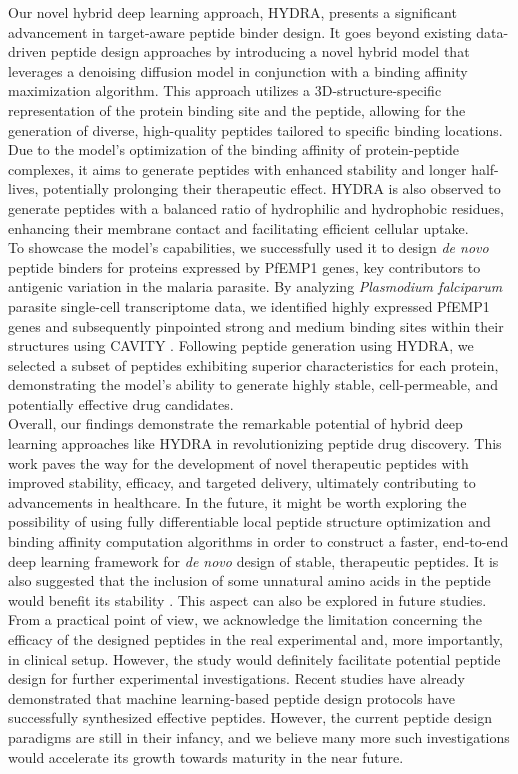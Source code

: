 Our novel hybrid deep learning approach, HYDRA, presents a significant advancement in target-aware peptide binder design. It goes beyond existing data-driven peptide design approaches by introducing a novel hybrid model that leverages a denoising diffusion model in conjunction with a binding affinity maximization algorithm. This approach utilizes a 3D-structure-specific representation of the protein binding site and the peptide, allowing for the generation of diverse, high-quality peptides tailored to specific binding locations. Due to the model's optimization of the binding affinity of protein-peptide complexes, it aims to generate peptides with enhanced stability and longer half-lives, potentially prolonging their therapeutic effect. HYDRA is also observed to generate peptides with a balanced ratio of hydrophilic and hydrophobic residues, enhancing their membrane contact and facilitating efficient cellular uptake.  \\

To showcase the model's capabilities, we successfully used it to design \textit{de novo} peptide binders for proteins expressed by PfEMP1 genes, key contributors to antigenic variation in the malaria parasite. By analyzing \textit{Plasmodium falciparum} parasite single-cell transcriptome data, we identified highly expressed PfEMP1 genes and subsequently pinpointed strong and medium binding sites within their structures using CAVITY \cite{Yuan2013}. Following peptide generation using HYDRA, we selected a subset of peptides exhibiting superior characteristics for each protein, demonstrating the model's ability to generate highly stable, cell-permeable, and potentially effective drug candidates. \\

Overall, our findings demonstrate the remarkable potential of hybrid deep learning approaches like HYDRA in revolutionizing peptide drug discovery. This work paves the way for the development of novel therapeutic peptides with improved stability, efficacy, and targeted delivery, ultimately contributing to advancements in healthcare. In the future, it might be worth exploring the possibility of using fully differentiable local peptide structure optimization and binding affinity computation algorithms \cite{wang2023fully} in order to construct a faster, end-to-end deep learning framework for \textit{de novo} design of stable, therapeutic peptides. It is also suggested that the inclusion of some unnatural amino acids in the peptide would benefit its stability \cite{adhikari2021reprogramming}. This aspect can also be explored in future studies. From a practical point of view, we acknowledge the limitation concerning the efficacy of the designed peptides in the real experimental and, more importantly, in clinical setup. However, the study would definitely facilitate potential peptide design for further experimental investigations. Recent studies have already demonstrated that machine learning-based peptide design protocols have successfully synthesized effective peptides. However, the current peptide design paradigms are still in their infancy, and we believe many more such investigations would accelerate its growth towards maturity in the near future. 
